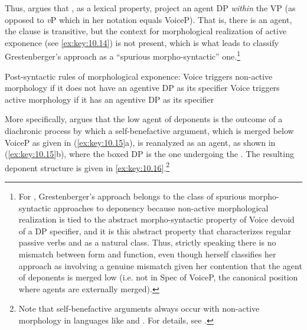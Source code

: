 \documentclass[output=paper]{langsci/langscibook}
\begin{document}
Thus, \citeauthor{Grestenberger2014} argues that , as a lexical property, project
an agent DP \emph{within} the VP (as opposed to \emph{v}P which in her notation
equals VoiceP). That is, there is an agent, the clause is transitive, but the
context for morphological realization of active exponence (see \eqref{ex:key:10.14})
is not present, which is what leads \citet{Muller2016b} to classify
Grestenberger’s approach as a “spurious morpho-syntactic” one.\footnote{For
    \citet{Muller2016b}, Grestenberger’s approach belongs to the class of
    spurious morpho-syntactic approaches to deponency because non-active
    morphological realization is tied to the abstract morpho-syntactic property
    of Voice devoid of a DP specifier, and it is this abstract property that
    characterizes regular passive verbs and  as a natural class.
    Thus, strictly speaking there is no mismatch between form and function,
    even though \citeauthor{Grestenberger2014} herself classifies her approach as involving a
    genuine mismatch given her contention that the agent of deponents is merged
low (i.e. not in Spec of VoiceP, the canonical position where agents are
externally merged).}

\ea%
    \label{ex:key:10.14} Post-syntactic rules of morphological exponence:
    \ea Voice triggers non-active morphology if it does not have an agentive DP
        as its specifier
    \ex Voice triggers active morphology if it has an agentive DP as its
        specifier
    \z
\z

More specifically, \citeauthor{Grestenberger2014} argues that the low agent of deponents is the
outcome of a diachronic  process by which a self-benefactive
argument, which is merged below VoiceP as given in (\ref{ex:key:10.15}a), is
reanalyzed as an agent, as shown in (\ref{ex:key:10.15}b), where the boxed DP is the
one undergoing the . The resulting deponent structure is given in
\eqref{ex:key:10.16}.\footnote{Note that self-benefactive arguments always occur
with non-active morphology in languages like  and . For details, see
\textcite{Grestenberger2014,Grestenberger2018a}.}
\end{document}
